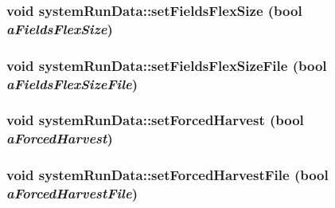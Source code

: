 \label{classsystem_run_data_adfa8b92e71fd5d8dff2a8beb1e9a1a80}
\hypertarget{classsystem_run_data_a32fdf06a096c486eba6694b53d35725b}{
\subsubsection[{setFieldsFlexSize}]{\setlength{\rightskip}{0pt plus 5cm}void systemRunData::setFieldsFlexSize (bool {\em aFieldsFlexSize})}}
\label{classsystem_run_data_a32fdf06a096c486eba6694b53d35725b}
\hypertarget{classsystem_run_data_a24d4c1389d1af5f67cf0b9f453833c10}{
\subsubsection[{setFieldsFlexSizeFile}]{\setlength{\rightskip}{0pt plus 5cm}void systemRunData::setFieldsFlexSizeFile (bool {\em aFieldsFlexSizeFile})}}
\label{classsystem_run_data_a24d4c1389d1af5f67cf0b9f453833c10}
\hypertarget{classsystem_run_data_aa9b8af6097b6b29afdad5a05b5f0cbc7}{
\subsubsection[{setForcedHarvest}]{\setlength{\rightskip}{0pt plus 5cm}void systemRunData::setForcedHarvest (bool {\em aForcedHarvest})}}
\label{classsystem_run_data_aa9b8af6097b6b29afdad5a05b5f0cbc7}
\hypertarget{classsystem_run_data_a3b7cd49bc1630a54ae34102205475e9b}{
\subsubsection[{setForcedHarvestFile}]{\setlength{\rightskip}{0pt plus 5cm}void systemRunData::setForcedHarvestFile (bool {\em aForcedHarvestFile})}}
